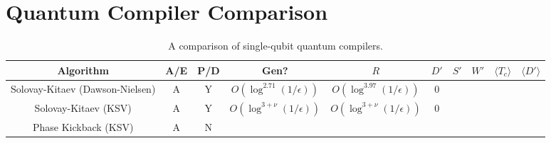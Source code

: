 \section{Quantum Compiler Comparison}
\label{sec:qcompile-compare}

\begin{table}[hbt!]
\begin{tabular}{|c|c|c|c|c|c|c|c|c|c}
\hline
Algorithm & A/E & P/D & Gen? & $R$ & $D'$ & $S'$ & $W'$ & $\langle T_c \rangle$ & $\langle D' \rangle$ \\
\hline
Solovay-Kitaev (Dawson-Nielsen) & A & Y & $O(\log^{2.71}(1/\epsilon))$ & $O(\log^{3.97}(1/\epsilon))$ & 0 & & \\
Solovay-Kitaev (KSV) & A & Y & $O(\log^{3+\nu}(1/\epsilon))$ & $O(\log^{3+\nu}(1/\epsilon))$ & 0 & & \\
Phase Kickback (KSV) & A & N &  & & & & \\
\end{tabular}
\caption{A comparison of single-qubit quantum compilers.}
\label{tab:qcompile-compare}
\end{table}